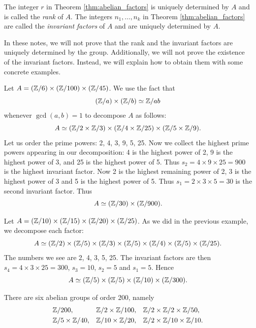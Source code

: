 The integer $r$ 
in Theorem \ref{thm:abelian_factors}
is uniquely determined by $A$ and 
is called the \emph{rank} of $A$. The integers $n_1,\dots,n_k$ 
in Theorem \ref{thm:abelian_factors}
are called the \emph{invariant factors} of $A$ and 
are uniquely determined by $A$. 

In these notes, we will not prove that the rank and the invariant factors are uniquely determined by the group. Additionally, we will not prove the existence 
of the invariant factors. Instead, we will explain how to obtain them with some concrete examples.

\begin{example}
\label{exa:[6,100,45]}
    Let $A=(\mathbb{Z}/6)\times(\mathbb{Z}/100)\times(\mathbb{Z}/45)$. We use 
    the fact that 
    \[
    (\mathbb{Z}/a)\times(\mathbb{Z}/b)\simeq\mathbb{Z}/ab
    \]
    whenever $\gcd(a,b)=1$
    to decompose $A$ as follows:
    \[
    A\simeq (\mathbb{Z}/2\times\mathbb{Z}/3)\times(\mathbb{Z}/4\times\mathbb{Z}/25)\times(\mathbb{Z}/5\times\mathbb{Z}/9).
    \]
    Let us order the prime powers: 2, 4, 3, 9, 5, 25. 
    Now we collect the highest prime powers appearing in our decomposition: 4 is the highest power of 2,
    9 is the highest power of 3, and 25 is the highest power of 5. Thus 
    $s_2=4\times 9\times 25=900$ is the highest invariant factor. Now 
    2 is the highest remaining power of 2, 
    3 is the highest power of 3 and 5 is the highest power of 5. Thus 
    $s_1=2\times 3\times 5=30$ is the second invariant factor. 
    Thus 
    \[ 
    A\simeq (\mathbb{Z}/30)\times(\mathbb{Z}/900).
    \]
\end{example}

\begin{example}
\label{exa:[10,15,20,25]}
    Let $A=(\mathbb{Z}/10)\times(\mathbb{Z}/15)\times(\mathbb{Z}/20)\times(\mathbb{Z}/25)$. 
    As we did in the previous example, we decompose each factor: 
    \[ 
    A\simeq (\mathbb{Z}/2)\times(\mathbb{Z}/5)\times(\mathbb{Z}/3)\times (\mathbb{Z}/5)\times(\mathbb{Z}/4)\times (\mathbb{Z}/5)\times(\mathbb{Z}/25). 
    \]
    The numbers we see are 2, 4, 3, 5, 25. The invariant factors are
    then $s_4=4\times 3\times 25=300$, $s_3=10$, $s_2=5$ and $s_1=5$. 
    Hence 
    \[ 
    A\simeq (\mathbb{Z}/5)\times(\mathbb{Z}/5)\times(\mathbb{Z}/10)\times(\mathbb{Z}/300).
    \]
\end{example}

\begin{example}
\label{exa:abelian_200}
    There are six abelian groups of order 200, namely
    \begin{align*}
        &\mathbb{Z}/{200}, 
        &&\mathbb{Z}/{2}\times\mathbb{Z}/{100}, 
        &&\mathbb{Z}/{2}\times\mathbb{Z}/{2}\times\mathbb{Z}/{50},\\ 
        &\mathbb{Z}/{5}\times\mathbb{Z}/{40}, 
        &&\mathbb{Z}/{10}\times\mathbb{Z}/{20}, 
        &&\mathbb{Z}/{2}\times\mathbb{Z}/{10}\times\mathbb{Z}/{10}.
    \end{align*}
\end{example}


